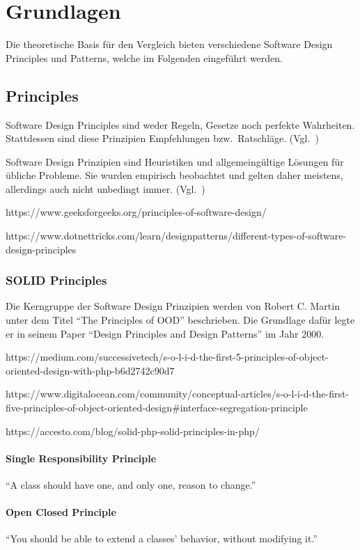 \section{Grundlagen}
Die theoretische Basis für den Vergleich bieten verschiedene Software Design Principles und Patterns, welche
im Folgenden eingeführt werden.

\subsection{Principles}
Software Design Principles sind weder Regeln, Gesetze noch perfekte Wahrheiten.
Stattdessen sind diese Prinzipien Empfehlungen bzw.\ Ratschläge.
(Vgl.~\cite{getting-a-solid-start})

Software Design Prinzipien sind Heuristiken und allgemeingültige Lösungen für übliche Probleme.
Sie wurden empirisch beobachtet und gelten daher meistens, allerdings auch nicht unbedingt immer.
(Vgl.~\cite{getting-a-solid-start})

https://www.geeksforgeeks.org/principles-of-software-design/

https://www.dotnettricks.com/learn/designpatterns/different-types-of-software-design-principles

\subsubsection{SOLID Principles}
Die Kerngruppe der Software Design Prinzipien werden von Robert C. Martin unter dem Titel \enquote{The Principles of OOD}\cite{solid} beschrieben.
Die Grundlage dafür legte er in seinem Paper \enquote{Design Principles and Design Patterns}\cite{design-principles-and-design-patterns} im Jahr 2000.

https://medium.com/successivetech/s-o-l-i-d-the-first-5-principles-of-object-oriented-design-with-php-b6d2742c90d7

https://www.digitalocean.com/community/conceptual-articles/s-o-l-i-d-the-first-five-principles-of-object-oriented-design#interface-segregation-principle

https://accesto.com/blog/solid-php-solid-principles-in-php/

\paragraph{Single Responsibility Principle}
\enquote{A class should have one, and only one, reason to change.}\cite{solid}

\paragraph{Open Closed Principle}
\enquote{You should be able to extend a classes' behavior, without modifying it.}\cite{solid}

